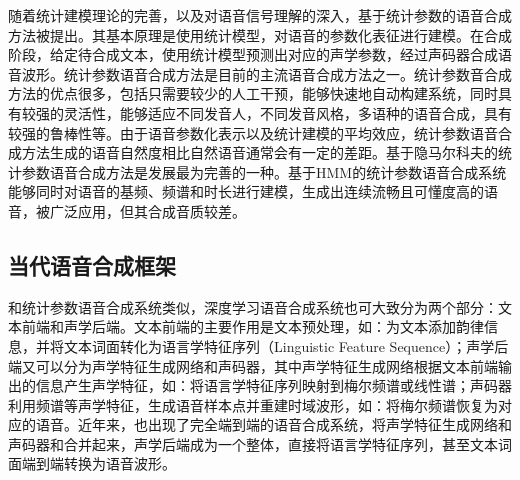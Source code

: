 \documentclass[cn,10pt,math=newtx,citestyle=gb7714-2015,bibstyle=gb7714-2015]{elegantbook}
\begin{document}
  随着统计建模理论的完善，以及对语音信号理解的深入，基于统计参数的语音合成方法被提出。其基本原理是使用统计模型，对语音的参数化表征进行建模。在合成阶段，给定待合成文本，使用统计模型预测出对应的声学参数，经过声码器合成语音波形。统计参数语音合成方法是目前的主流语音合成方法之一。统计参数音合成方法的优点很多，包括只需要较少的人工干预，能够快速地自动构建系统，同时具有较强的灵活性，能够适应不同发音人，不同发音风格，多语种的语音合成，具有较强的鲁棒性等。由于语音参数化表示以及统计建模的平均效应，统计参数语音合成方法生成的语音自然度相比自然语音通常会有一定的差距。基于隐马尔科夫的统计参数语音合成方法是发展最为完善的一种。基于HMM的统计参数语音合成系统能够同时对语音的基频、频谱和时长进行建模，生成出连续流畅且可懂度高的语音，被广泛应用，但其合成音质较差。

\subsection{当代语音合成框架}

和统计参数语音合成系统类似，深度学习语音合成系统也可大致分为两个部分：文本前端和声学后端。文本前端的主要作用是文本预处理，如：为文本添加韵律信息，并将文本词面转化为语言学特征序列（Linguistic Feature Sequence）；声学后端又可以分为声学特征生成网络和声码器，其中声学特征生成网络根据文本前端输出的信息产生声学特征，如：将语言学特征序列映射到梅尔频谱或线性谱；声码器利用频谱等声学特征，生成语音样本点并重建时域波形，如：将梅尔频谱恢复为对应的语音。近年来，也出现了完全端到端的语音合成系统，将声学特征生成网络和声码器和合并起来，声学后端成为一个整体，直接将语言学特征序列，甚至文本词面端到端转换为语音波形。
\end{document}
